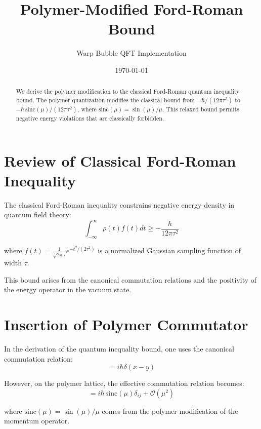 \documentclass[11pt]{article}
\title{Polymer-Modified Ford-Roman Bound}
\author{Warp Bubble QFT Implementation}
\date{\today}
\begin{document}
\maketitle

\begin{abstract}
We derive the polymer modification to the classical Ford-Roman quantum inequality bound. The polymer quantization modifies the classical bound from $-\hbar/(12\pi\tau^2)$ to $-\hbar\,\mathrm{sinc}(\mu)/(12\pi\tau^2)$, where $\mathrm{sinc}(\mu) = \sin(\mu)/\mu$. This relaxed bound permits negative energy violations that are classically forbidden.
\end{abstract}

\section{Review of Classical Ford-Roman Inequality}

The classical Ford-Roman inequality constrains negative energy density in quantum field theory:
\begin{equation}
\int_{-\infty}^{\infty} \rho(t) f(t) dt \geq -\frac{\hbar}{12\pi\tau^2}
\end{equation}

where $f(t) = \frac{1}{\sqrt{2\pi}\tau} e^{-t^2/(2\tau^2)}$ is a normalized Gaussian sampling function of width $\tau$.

This bound arises from the canonical commutation relations and the positivity of the energy operator in the vacuum state.

\section{Insertion of Polymer Commutator}

In the derivation of the quantum inequality bound, one uses the canonical commutation relation:
\begin{equation}
[\hat{\phi}(x), \hat{\pi}(y)] = i\hbar\delta(x-y)
\end{equation}

However, on the polymer lattice, the effective commutation relation becomes:
\begin{equation}
[\hat{\phi}_i, \hat{\pi}_j^{\rm poly}] = i\hbar\,\mathrm{sinc}(\mu)\delta_{ij} + \mathcal{O}(\mu^2)
\end{equation}

where $\mathrm{sinc}(\mu) = \sin(\mu)/\mu$ comes from the polymer modification of the momentum operator.
\end{document}
